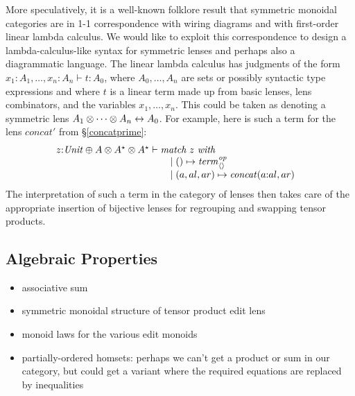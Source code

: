 \begin{itemize}
        More speculatively, it is a well-known folklore result that
        symmetric monoidal categories are in 1-1 correspondence with wiring
        diagrams and with first-order linear lambda calculus. We would like
        to exploit this correspondence to design a lambda-calculus-like
        syntax for symmetric lenses and perhaps also a diagrammatic
        language. The linear lambda calculus has judgments of the form
        $x_1{:}A_1,\dots,x_n{:}A_n\vdash t:A_0$, where $A_0,\dots,A_n$ are
        sets or possibly syntactic type expressions and where $t$ is a
        linear term made up from basic lenses, lens combinators, and the
        variables $x_1,\dots,x_n$. This could be taken as denoting a
        symmetric lens $A_1\otimes\dots\otimes A_n\leftrightarrow A_0$. For example,
        here is such a term for the lens $\mathit{concat}'$ from
        \S\ref{concatprime}:
        \[\begin{array}{@{}l}
        z{:}\Unit \oplus A \otimes A\LIST\otimes A\LIST\vdash
            \begin{array}[t]{@{}l}
            \textit{match}\ z\ \textit{with} \\
            \quad \mid\mlinl\unit \mapsto \const_{\NIL}\op\\
            \quad\mid\mlinr(a,al,ar)\mapsto \mathit{concat}(a\CONS al,ar)
            \end{array}
        \end{array}
        \]
        The interpretation of such a term in the category of lenses then
        takes care of the appropriate insertion of bijective lenses for
        regrouping and swapping tensor products.
\end{itemize}

\subsection{Algebraic Properties}
\label{sec:future-algebra}
\begin{itemize}
    \item associative sum
    \item symmetric monoidal structure of tensor product edit lens
    \item monoid laws for the various edit monoids
    \item partially-ordered homsets: perhaps we can't get a product or sum
        in our category, but could get a variant where the required
        equations are replaced by inequalities
\end{itemize}

